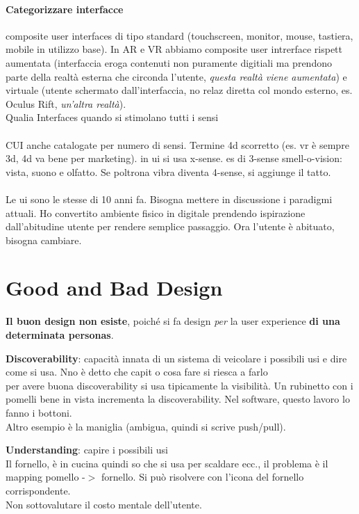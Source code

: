 \documentclass[10pt]{article}
\begin{document}
\paragraph{Categorizzare interfacce} composite user interfaces di tipo standard (touchscreen, monitor, mouse, tastiera, mobile in utilizzo base). In AR e VR abbiamo composite user intrerface rispett aumentata (interfaccia eroga contenuti non puramente digitiali ma prendono parte della realtà esterna che circonda l'utente, \textit{questa realtà viene aumentata}) e virtuale (utente schermato dall'interfaccia, no relaz diretta col mondo esterno, es. Oculus Rift, \textit{un'altra realtà}).\\
Qualia Interfaces quando si stimolano tutti i sensi\\\\
CUI anche catalogate per numero di sensi. Termine 4d scorretto (es. vr è sempre 3d, 4d va bene per marketing). in ui si usa x-sense. es di 3-sense smell-o-vision: vista, suono e olfatto. Se poltrona vibra diventa 4-sense, si aggiunge il tatto.\\\\
Le ui sono le stesse di 10 anni fa. Bisogna mettere in discussione i paradigmi attuali. Ho convertito ambiente fisico in digitale prendendo ispirazione dall'abitudine utente per rendere semplice passaggio. Ora l'utente è abituato, bisogna cambiare.

\section{Good and Bad Design}
\textbf{Il buon design non esiste}, poiché si fa design \textit{per} la user experience \textbf{di una determinata personas}.
\begin{list}{}{Le due caratteristiche più importanti su cui misurare il buon design sono:}
\item \textbf{Discoverability}: capacità innata di un sistema di veicolare i possibili usi e dire come si usa. Nno è detto che capit o cosa fare si riesca a farlo\\
per avere buona discoverability si usa tipicamente la visibilità. Un rubinetto con i pomelli bene in vista incrementa la discoverability. Nel software, questo lavoro lo fanno i bottoni.\\
Altro esempio è la maniglia (ambigua, quindi si scrive push/pull).
\item \textbf{Understanding}: capire i possibili usi\\
Il fornello, è in cucina quindi so che si usa per scaldare ecc., il problema è il mapping pomello -$>$ fornello. Si può risolvere con l'icona del fornello corrispondente.\\
Non sottovalutare il costo mentale dell'utente.\\
\end{list}
\end{document}
